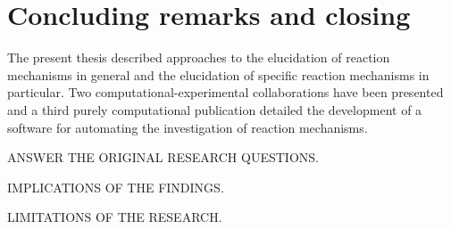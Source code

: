 \chapter{Concluding remarks and closing}%
\label{ch:conclusion}

The present thesis described approaches to the elucidation of reaction
mechanisms in general and the elucidation of specific reaction mechanisms in
particular.
Two computational-experimental collaborations have been presented and a third
purely computational publication detailed the development of a software for
automating the investigation of reaction mechanisms.

ANSWER THE ORIGINAL RESEARCH QUESTIONS.\@

IMPLICATIONS OF THE FINDINGS.\@

LIMITATIONS OF THE RESEARCH.\@
